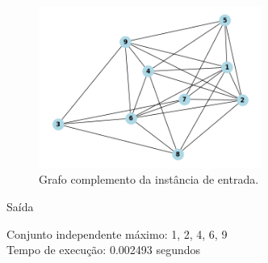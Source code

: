 \documentclass[compress,aspectratio=169]{beamer}
\begin{document}
    \begin{frame}
        \begin{figure}[H]
            \centering
            \includegraphics[width=0.65\textwidth]{images/conj_instancia1.png}
            \caption{Grafo complemento da instância de entrada.}
            \label{fig:instancia2}
        \end{figure}
    \end{frame}
    
    \begin{frame}{Saída}
        \begin{tcolorbox}[title=Saída da instância, width=\linewidth, 
          fontupper=\ttfamily, 
          halign=flush left]
            Conjunto independente máximo: {1, 2, 4, 6, 9}\\
            Tempo de execução: 0.002493 segundos\\
        \end{tcolorbox}
    \end{frame}
\end{document}
